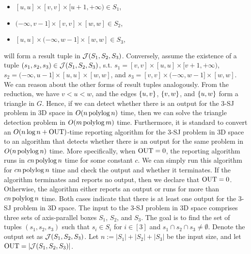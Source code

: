 \begin{itemize}
    \item $[u,u]\times [v,v]\times[u+1, +\infty)\in S_1$,
    \item $(-\infty,v-1]\times[v,v]\times [w,w] \in S_2$,
    \item $[u,u]\times(-\infty, w-1]\times [w,w] \in S_3$,
\end{itemize}
will form a result tuple in $\mathcal{J}(S_1,S_2,S_3)$. Conversely, assume the existence of a tuple $(s_1,s_2,s_3)\in \mathcal{J}(S_1,S_2,S_3)$, s.t. $s_1 = [v,v]\times [u,u]\times[v+1, +\infty)$, $s_2 = (-\infty,u-1]\times[u,u]\times [w,w]$, and $s_3 = [v,v]\times(-\infty, w-1]\times [w,w]$. We can reason about the other forms of result tuples analogously. From the reduction, we have $v< u< w$, and the edges $\{u,v\}$, $\{v,w\}$, and $\{u,w\}$ form a triangle in $G$. 
Hence, if we can detect whether there is an output for the 3-SJ problem in 3D space in $O(n\operatorname*{polylog} n)$ time, then we can solve the triangle detection problem 
in $O(m \operatorname*{polylog} m)$ time. Furthermore, it is standard to convert an $O(n \log n + \mathrm{OUT})$-time reporting algorithm for the 3-SJ problem in 3D space to an algorithm that detects whether there is an output for the same problem in $O(n \operatorname*{polylog} n)$ time. More specifically, when $\mathrm{OUT} = 0$, the reporting algorithm runs in $cn\operatorname*{polylog} n$ time for some constant $c$. We can simply run this algorithm for $cn\operatorname*{polylog} n$ time and check the output and whether it terminates. If the algorithm terminates and reports no output, then we declare that $\mathrm{OUT} = 0$. Otherwise, the algorithm either reports an output or runs for more than $cn\operatorname*{polylog} n$ time. Both cases indicate that there is at least one output for the 3-SJ problem in 3D space.  The input to the 3-SJ problem in 3D space comprises
 three sets of axis-parallel boxes $S_1$, $S_2$, and $S_3$. 
The goal is to find the set of tuples $(s_1,s_2,s_3)$ such that $s_i \in S_i$ for $i \in [3]$ and $s_1 \cap s_2 \cap s_3 \neq \emptyset$. Denote the output set as $\mathcal{J}(S_1,S_2,S_3)$.
Let $n:=|S_1|+|S_2|+|S_3|$ be the input size, and let $\mathrm{OUT} = |\mathcal{J}(S_1,S_2,S_3)|$.

